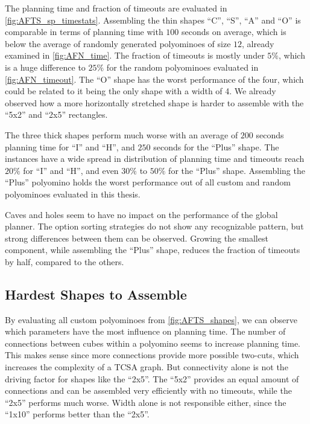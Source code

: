 The planning time and fraction of timeouts are evaluated in \autoref{fig:AFTS_sp_timestats}.
Assembling the thin shapes ``C'', ``S'', ``A'' and ``O'' is comparable in terms of planning time with $100$ seconds on average, which is below the average of randomly generated polyominoes of size $12$, already examined in \autoref{fig:AFN_time}.
The fraction of timeouts is mostly under $5\%$, which is a huge difference to $25\%$ for the random polyominoes evaluated in \autoref{fig:AFN_timeout}.
The ``O'' shape has the worst performance of the four, which could be related to it being the only shape with a width of 4.
We already observed how a more horizontally stretched shape is harder to assemble with the ``5x2'' and ``2x5'' rectangles.

The three thick shapes perform much worse with an average of $200$ seconds planning time for ``I'' and ``H'', and $250$ seconds for the ``Plus'' shape.
The instances have a wide spread in distribution of planning time and timeouts reach $20\%$ for ``I'' and ``H'', and even $30\%$ to $50\%$ for the ``Plus'' shape.
Assembling the ``Plus'' polyomino holds the worst performance out of all custom and random polyominoes evaluated in this thesis.

Caves and holes seem to have no impact on the performance of the global planner.
The option sorting strategies do not show any recognizable pattern, but strong differences between them can be observed.
Growing the smallest component, while assembling the ``Plus'' shape, reduces the fraction of timeouts by half, compared to the others.

\newpage

\subsection{Hardest Shapes to Assemble}
\label{sec:hard_shape}

By evaluating all custom polyominoes from \autoref{fig:AFTS_shapes}, we can observe which parameters have the most influence on planning time.
The number of connections between cubes within a polyomino seems to increase planning time.
This makes sense since more connections provide more possible two-cuts, which increases the complexity of a TCSA graph.
But connectivity alone is not the driving factor for shapes like the ``2x5''.
The ``5x2'' provides an equal amount of connections and can be assembled very efficiently with no timeouts, while the ``2x5'' performs much worse.
Width alone is not responsible either, since the ``1x10'' performs better than the ``2x5''.


